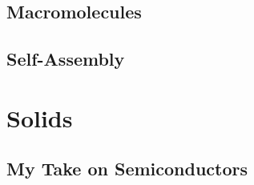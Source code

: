 \documentclass[12pt, openany, letterpaper]{memoir}
\begin{document}
\section{Macromolecules}

\section{Self-Assembly}

\chapter{Solids}
\section*{My Take on Semiconductors}
\end{document}
